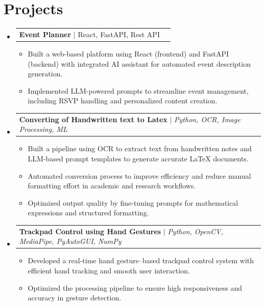 \documentclass[letterpaper,11pt]{article}
\makeatletter
\newcommand{\resumeItem}[1]{
  \item\small{
    {#1 \vspace{-2pt}}
  }
}
\newcommand{\resumeProjectHeading}[2]{
    \item
    \begin{tabular*}{0.97\textwidth}{l@{\extracolsep{\fill}}r}
      \small#1 & #2 \\
    \end{tabular*}\vspace{-2pt}
}
\newcommand{\resumeSubHeadingListStart}{\begin{itemize}[leftmargin=0.15in,topmargin=0.10in, label={}]}
\newcommand{\resumeSubHeadingListEnd}{\end{itemize}\vspace{-10pt}}
\newcommand{\resumeItemListStart}{\begin{itemize}\vspace{-5pt}}
\newcommand{\resumeItemListEnd}{\end{itemize}\vspace{-4pt}}
\makeatother
\begin{document}
\section{Projects}
    \resumeSubHeadingListStart
      \resumeProjectHeading
          {\textbf{Event Planner} $|$ {React, FastAPI, Rest API}}{}
          \resumeItemListStart
            \resumeItem{Built a web-based platform using React (frontend) and FastAPI (backend) with integrated AI assistant for automated event description generation.}
          \resumeItemListEnd
          \resumeItemListStart
            \resumeItem{Implemented LLM-powered prompts to streamline event management, including RSVP handling and personalized content creation.}
          \resumeItemListEnd
          
    

    \resumeProjectHeading
          {\textbf{Converting of Handwritten text to Latex} $|$ \emph{Python, OCR, Image Processing, ML}}{}
          \resumeItemListStart
            \resumeItem{ Built a pipeline using OCR to extract text from handwritten notes and LLM-based prompt templates to generate accurate LaTeX documents.}
         \resumeItemListEnd
         \resumeItemListStart
            \resumeItem{Automated conversion process to improve efficiency and reduce manual formatting effort in academic and research workflows.}
         \resumeItemListEnd
         \resumeItemListStart
            \resumeItem{Optimized output quality by fine-tuning prompts for mathematical expressions and structured formatting.}
         \resumeItemListEnd
         
    \resumeProjectHeading
          {\textbf{Trackpad Control using Hand Gestures} $|$ \emph{Python, OpenCV, MediaPipe, PyAutoGUI, NumPy}}{}
          \resumeItemListStart
            \resumeItem{Developed a real-time hand gesture–based trackpad control system with efficient hand tracking and smooth user interaction.}
         \resumeItemListEnd
         \resumeItemListStart
            \resumeItem{Optimized the processing pipeline to ensure high responsiveness and accuracy in gesture detection.}
         \resumeItemListEnd
    \resumeSubHeadingListEnd
%







\end{document}
